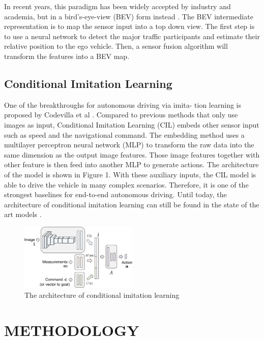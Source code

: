 \documentclass[conference]{IEEEtran}
\begin{document}
In recent years, this paradigm has been widely accepted by industry and academia, but in a bird's-eye-view (BEV) form instead \cite{tesla} \cite{hu2021fiery} \cite{li2022bevformer} \cite{liu2023bevfusion}. The BEV intermediate representation is to map the sensor input into a top down view. The first step is to use a neural network to detect the major traffic participants and estimate their relative position to the ego vehicle. Then, a sensor fusion algorithm will transform the features into a BEV map.

\subsection{Conditional Imitation Learning}

One of the breakthroughs for autonomous driving via imita- tion learning is proposed by Codevilla et al \cite{codevilla2018end} \cite{codevilla2019exploring}. Compared to previous methods that only use images as input, Conditional Imitation Learning (CIL) embeds other sensor input such as speed and the navigational command. The embedding
method uses a multilayer perceptron neural network (MLP) to transform the raw data into the same dimension as the output image features. Those image features together with other feature is then feed into another MLP to generate actions. The architecture of the model is shown in Figure 1. With these auxiliary inputs, the CIL model is able to drive the vehicle in many complex scenarios. Therefore, it is one of the strongest baselines for end-to-end autonomous driving. Until today, the architecture of conditional imitation learning can still be found in the state of the art models \cite{wu2022trajectory}.

\begin{figure}[htbp]
    \centering
    \includegraphics[width=0.5\textwidth]{1.png}
    \caption{The architecture of conditional imitation learning\cite{codevilla2018end}}
    \label{fig:1}
\end{figure}

\section{METHODOLOGY}
\end{document}
